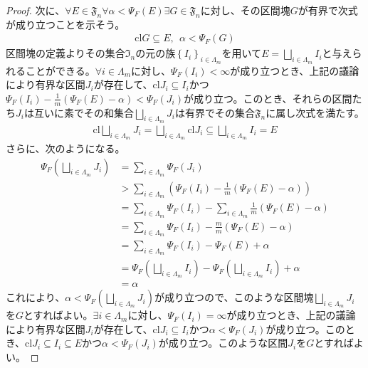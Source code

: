 \documentclass[dvipdfmx]{jsarticle}
\begin{document}
\begin{proof}
次に、$\forall E \in \mathfrak{F}_{n}\forall\alpha < \varPsi_{F}(E)\exists G \in \mathfrak{F}_{n}$に対し、その区間塊$G$が有界で次式が成り立つことを示そう。
\begin{align*}
\mathrm{cl}G \subseteq E,\ \ \alpha < \varPsi_{F}(G)
\end{align*}
区間塊の定義よりその集合$\mathfrak{I}_{n}$の元の族$\left\{ I_{i} \right\}_{i \in \varLambda_{m}}$を用いて$E = \bigsqcup_{i \in \varLambda_{m}} I_{i}$と与えられることができる。$\forall i \in \varLambda_{m}$に対し、$\varPsi_{F}\left( I_{i} \right) < \infty$が成り立つとき、上記の議論により有界な区間$J_{i}$が存在して、$\mathrm{cl}J_{i} \subseteq I_{i}$かつ$\varPsi_{F}\left( I_{i} \right) - \frac{1}{m}\left( \varPsi_{F}(E) - \alpha \right) < \varPsi_{F}\left( J_{i} \right)$が成り立つ。このとき、それらの区間たち$J_{i}$は互いに素でその和集合$\bigsqcup_{i \in \varLambda_{m}} J_{i}$は有界でその集合$\mathfrak{F}_{n}$に属し次式を満たす。
\begin{align*}
\mathrm{cl}{\bigsqcup_{i \in \varLambda_{m}} J_{i}} = \bigsqcup_{i \in \varLambda_{m}} {\mathrm{cl}J_{i}} \subseteq \bigsqcup_{i \in \varLambda_{m}} I_{i} = E
\end{align*}
さらに、次のようになる。
\begin{align*}
\varPsi_{F}\left( \bigsqcup_{i \in \varLambda_{m}} J_{i} \right) &= \sum_{i \in \varLambda_{m}} {\varPsi_{F}\left( J_{i} \right)}\\
&> \sum_{i \in \varLambda_{m}} \left( \varPsi_{F}\left( I_{i} \right) - \frac{1}{m}\left( \varPsi_{F}(E) - \alpha \right) \right)\\
&= \sum_{i \in \varLambda_{m}} {\varPsi_{F}\left( I_{i} \right)} - \sum_{i \in \varLambda_{m}} {\frac{1}{m}\left( \varPsi_{F}(E) - \alpha \right)}\\
&= \sum_{i \in \varLambda_{m}} {\varPsi_{F}\left( I_{i} \right)} - \frac{m}{m}\left( \varPsi_{F}(E) - \alpha \right)\\
&= \sum_{i \in \varLambda_{m}} {\varPsi_{F}\left( I_{i} \right)} - \varPsi_{F}(E) + \alpha\\
&= \varPsi_{F}\left( \bigsqcup_{i \in \varLambda_{m}} I_{i} \right) - \varPsi_{F}\left( \bigsqcup_{i \in \varLambda_{m}} I_{i} \right) + \alpha\\
&= \alpha
\end{align*}
これにより、$\alpha < \varPsi_{F}\left( \bigsqcup_{i \in \varLambda_{m}} J_{i} \right)$が成り立つので、このような区間塊$\bigsqcup_{i \in \varLambda_{m}} J_{i}$を$G$とすればよい。$\exists i \in \varLambda_{m}$に対し、$\varPsi_{F}\left( I_{i} \right) = \infty$が成り立つとき、上記の議論により有界な区間$J_{i}$が存在して、$\mathrm{cl}J_{i} \subseteq I_{i}$かつ$\alpha < \varPsi_{F}\left( J_{i} \right)$が成り立つ。このとき、$\mathrm{cl}J_{i} \subseteq I_{i} \subseteq E$かつ$\alpha < \varPsi_{F}\left( J_{i} \right)$が成り立つ。このような区間$J_{i}$を$G$とすればよい。\par

\end{proof}
\end{document}

